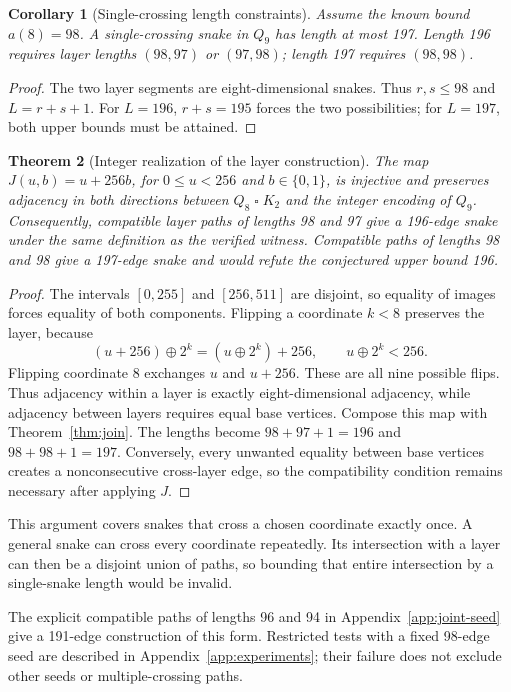 \documentclass[11pt,a4paper]{article}
\newtheorem{theorem}{Theorem}[section]
\newtheorem{corollary}[theorem]{Corollary}
\theoremstyle{definition}
\theoremstyle{remark}
\newcommand{\Q}{Q}
\begin{document}
\begin{corollary}[Single-crossing length constraints]
Assume the known bound $a(8)=98$. A single-crossing snake in $\Q_9$ has length at most 197. Length 196 requires layer lengths $(98,97)$ or $(97,98)$; length 197 requires $(98,98)$.
\end{corollary}
\begin{proof}
The two layer segments are eight-dimensional snakes. Thus $r,s\le98$ and $L=r+s+1$. For $L=196$, $r+s=195$ forces the two possibilities; for $L=197$, both upper bounds must be attained.
\end{proof}
\begin{theorem}[Integer realization of the layer construction]
The map $J(u,b)=u+256b$, for $0\le u<256$ and $b\in\{0,1\}$, is injective and preserves adjacency in both directions between $\Q_8\mathbin{\square}K_2$ and the integer encoding of $\Q_9$. Consequently, compatible layer paths of lengths 98 and 97 give a 196-edge snake under the same definition as the verified witness. Compatible paths of lengths 98 and 98 give a 197-edge snake and would refute the conjectured upper bound 196.
\end{theorem}
\begin{proof}
The intervals $[0,255]$ and $[256,511]$ are disjoint, so equality of images forces equality of both components. Flipping a coordinate $k<8$ preserves the layer, because
\[
(u+256)\mathbin{\oplus}2^k=(u\mathbin{\oplus}2^k)+256,
\qquad u\mathbin{\oplus}2^k<256.
\]
Flipping coordinate 8 exchanges $u$ and $u+256$. These are all nine possible flips. Thus adjacency within a layer is exactly eight-dimensional adjacency, while adjacency between layers requires equal base vertices. Compose this map with Theorem~\ref{thm:join}. The lengths become $98+97+1=196$ and $98+98+1=197$. Conversely, every unwanted equality between base vertices creates a nonconsecutive cross-layer edge, so the compatibility condition remains necessary after applying $J$.
\end{proof}
This argument covers snakes that cross a chosen coordinate exactly once. A general snake can cross every coordinate repeatedly. Its intersection with a layer can then be a disjoint union of paths, so bounding that entire intersection by a single-snake length would be invalid.

The explicit compatible paths of lengths 96 and 94 in Appendix~\ref{app:joint-seed} give a 191-edge construction of this form. Restricted tests with a fixed 98-edge seed are described in Appendix~\ref{app:experiments}; their failure does not exclude other seeds or multiple-crossing paths.
\end{document}
